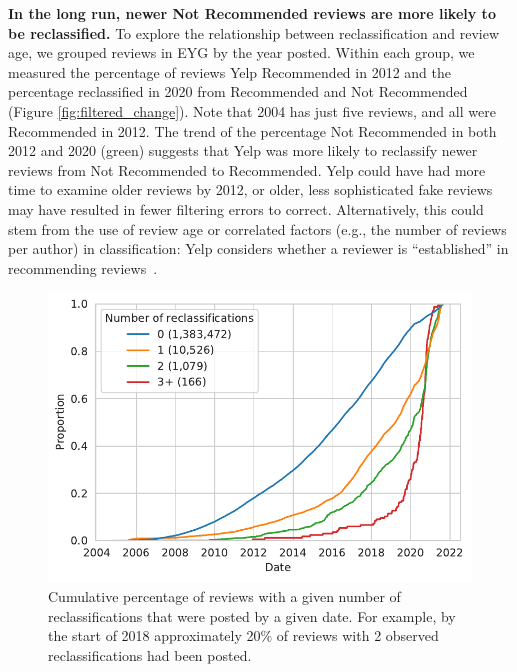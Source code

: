 \textbf{In the long run, newer Not Recommended reviews are more likely to be reclassified.} To explore the relationship between reclassification and review age, we grouped reviews in EYG by the year posted. Within each group, we measured the percentage of reviews Yelp Recommended in 2012 and the percentage reclassified in 2020 from Recommended and Not Recommended (Figure \ref{fig:filtered_change}). Note that 2004 has just five reviews, and all were Recommended in 2012. The trend of the percentage Not Recommended in both 2012 and 2020 (green) suggests that Yelp was more likely to reclassify newer reviews from Not Recommended to Recommended. Yelp could have had more time to examine older reviews by 2012, or older, less sophisticated fake reviews may have resulted in fewer filtering errors to correct. Alternatively, this could stem from the use of review age or correlated factors (e.g., the number of reviews per author) in classification: Yelp considers whether a reviewer is ``established'' in recommending reviews~\cite{yelpwhyrec}.

\begin{figure}[t]
    \centering
    \includegraphics[width=0.9\columnwidth]{chapters/reviews/figures/reclassification_by_date_grouped_chicago.pdf}
    \caption{Cumulative percentage of reviews with a given number of reclassifications that were posted by a given date. For example, by the start of 2018 approximately 20\% of reviews with 2 observed reclassifications had been posted.}
    \label{fig:reclassification_by_date_chicago}
\end{figure}

